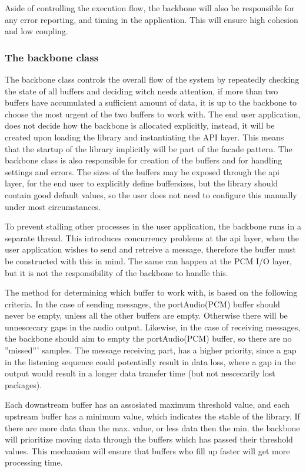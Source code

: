 Aside of controlling the execution flow, the backbone will also be responsible for any error reporting, and timing in the application. This will ensure high cohesion and low coupling.

\subsubsection{The backbone class}
The backbone class controls the overall flow of the system by repeatedly checking the state of all buffers and deciding witch needs attention, if more than two buffers have accumulated a sufficient amount of data, it is up to the backbone to choose the most urgent of the two buffers to work with.
The end user application, does not decide how the backbone is allocated explicitly, instead, it will be created upon loading the library and instantiating the API layer. This means that the startup of the library implicitly will be part of the facade pattern.
The backbone class is also responsible for creation of the buffers and for handling settings and errors. The sizes of the buffers may be exposed through the api layer, for the end user to explicitly define buffersizes, but the library should contain good default values, so the user does not need to configure this manually under most circumstances.

To prevent stalling other processes in the user application, the backbone runs in a separate thread. This introduces concurrency problems at the api layer, when the user application wishes to send and retreive a message, therefore the buffer must be constructed with this in mind.
The same can happen at the PCM I/O layer, but it is not the responsibility of the backbone to handle this.

The method for determining which buffer to work with, is based on the following criteria.
In the case of sending messages, the portAudio(PCM) buffer should never be empty, unless all the other buffers are empty. Otherwise there will be unnescecary gaps in the audio output.
Likewise, in the case of receiving messages, the backbone should aim to empty the portAudio(PCM) buffer, so there are no ''missed''' samples.
The message receiving part, has a higher priority, since a gap in the listening sequence could potentially result in data loss, where a gap in the output would result in a longer data transfer time (but not nescecarily lost packages).

Each downstream buffer has an assosiated maximum threshold value, and each upstream buffer has a minimum value, which indicates the stable of the library. If there are more data than the max. value, or less data then the min. the backbone will prioritize moving data through the buffers which has passed their threshold values. This mechanism will ensure that buffers who fill up faster will get more processing time.

